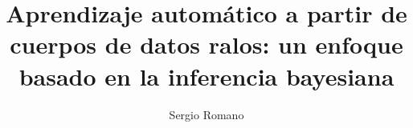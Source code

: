 \documentclass[letterpaper,12pt,openright]{report}
\title{Aprendizaje automático a partir de cuerpos de datos ralos: un enfoque basado en la inferencia bayesiana}
\author{Sergio Romano}
\begin{document}
\theoremstyle{definition}\newtheorem{definicion}[theorem]{Definición}
\newtheorem{teorema}[theorem]{Teorema}
\newtheorem{corolario}[theorem]{Corolario}
\newtheorem{proposicion}[theorem]{Proposición}
\newtheorem{lema}[theorem]{Lema}
\newtheorem{hecho}[theorem]{Hecho}


    
\restoregeometry 

    
    
    
    
\tableofcontents


\setlength{\parskip}{0.5em}

    
    
    
    
    
    
    
    
    
    
    \appendix
    
    
    
    
    
\end{document}
